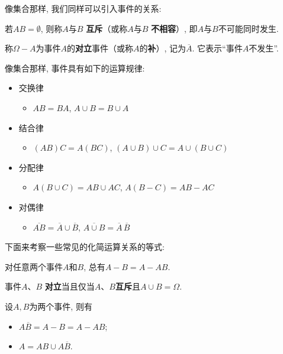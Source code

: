 像集合那样, 我们同样可以引入事件的关系:

\begin{definition}
    若$AB=\emptyset$, 则称$A$与$B$ \textbf{互斥}（或称$A$与$B$ \textbf{不相容}）, %
    即$A$与$B$不可能同时发生.
\end{definition}

\begin{definition}
    称$\Omega-A$为事件$A$的\textbf{对立}事件（或称$A$的\textbf{补}）, 记为$\overline{A}$.
    它表示“事件$A$不发生”.
\end{definition}


像集合那样, 事件具有如下的运算规律:
\begin{itemize}
    \item 交换律
          \begin{itemize}
              \item $AB=BA$, $A\cup B=B\cup A$
          \end{itemize}
    \item 结合律
          \begin{itemize}
              \item $(AB)C=A(BC)$, $(A\cup B)\cup C=A\cup(B\cup C)$
          \end{itemize}
    \item 分配律
          \begin{itemize}
              \item $A(B\cup C)=AB\cup AC$, $A(B-C)=AB-AC$
          \end{itemize}
    \item 对偶律
          \begin{itemize}
              \item $\overline{AB}=\overline{A}\cup\overline{B}$, $\overline{A\cup B}=\overline{A}\,\overline{B}$
          \end{itemize}
\end{itemize}

下面来考察一些常见的化简运算关系的等式:

\begin{proposition}
    对任意两个事件$A$和$B$, 总有$ A-B=A-AB$.
\end{proposition}

\begin{proposition}
    事件$A$、$B$ \textbf{对立}当且仅当$A$、$B$\textbf{互斥}且$A\cup B=\Omega$.
\end{proposition}
\begin{example}
    设$A,B$为两个事件, 则有
    \begin{itemize}
        \item $A\overline{B}=A-B=A-AB$;
        \item $A=AB\cup A\overline{B}$.
    \end{itemize}
\end{example}

